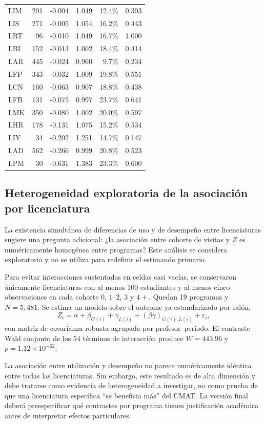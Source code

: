 \begin{longtable}{lrrrrr}
LIM & 201 & -0.004 & 1.049 & 12.4\% & 0.393 \\
LIS & 271 & -0.005 & 1.054 & 16.2\% & 0.443 \\
LRT & 96 & -0.010 & 1.049 & 16.7\% & 1.000 \\
LBI & 152 & -0.013 & 1.002 & 18.4\% & 0.414 \\
LAR & 445 & -0.024 & 0.960 & 9.7\% & 0.234 \\
LFP & 343 & -0.032 & 1.009 & 19.8\% & 0.551 \\
LCN & 160 & -0.063 & 0.907 & 18.8\% & 0.438 \\
LFB & 131 & -0.075 & 0.997 & 23.7\% & 0.641 \\
LMK & 350 & -0.080 & 1.002 & 20.0\% & 0.597 \\
LHR & 178 & -0.131 & 1.075 & 15.2\% & 0.534 \\
LIY & 34 & -0.202 & 1.251 & 14.7\% & 0.147 \\
LAD & 562 & -0.266 & 0.999 & 20.8\% & 0.523 \\
LPM & 30 & -0.631 & 1.383 & 23.3\% & 0.600 \\
\bottomrule
\end{longtable}


\subsection{Heterogeneidad exploratoria de la asociación por licenciatura}

La existencia simultánea de diferencias de uso y de desempeño entre licenciaturas sugiere una pregunta adicional: ¿la asociación entre cohorte de visitas y $Z$ es numéricamente homogénea entre programas? Este análisis se considera exploratorio y no se utiliza para redefinir el estimando primario.

Para evitar interacciones sustentadas en celdas casi vacías, se conservaron únicamente licenciaturas con al menos 100 estudiantes y al menos cinco observaciones en cada cohorte $0$, $1$--$2$, $3$ y $4+$. Quedan 19 programas y $N=5{,}481$. Se estima un modelo sobre el outcome ya estandarizado por salón,
\[
Z_i = \alpha + \beta_{G(i)} + \gamma_{L(i)} + (\beta\gamma)_{G(i),L(i)} + \varepsilon_i,
\]
con matriz de covarianza robusta agrupada por profesor--periodo. El contraste Wald conjunto de los 54 términos de interacción produce $W=443.96$ y $p=1.12\times10^{-62}$.

\begin{interpretbox}
La asociación entre utilización y desempeño no parece numéricamente idéntica entre todas las licenciaturas. Sin embargo, este resultado es de alta dimensión y debe tratarse como evidencia de heterogeneidad a investigar, no como prueba de que una licenciatura específica ``se beneficia más'' del CMAT. La versión final deberá preespecificar qué contrastes por programa tienen justificación académica antes de interpretar efectos particulares.
\end{interpretbox}

